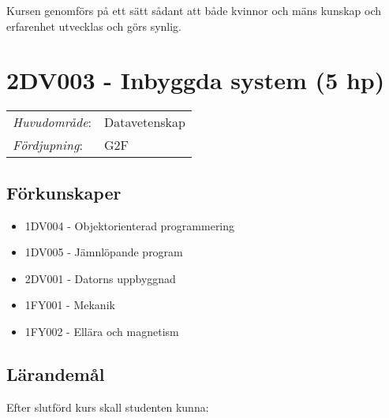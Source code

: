 Kursen genomförs på ett sätt sådant att både kvinnor och mäns kunskap och erfarenhet utvecklas och görs synlig.
\pagebreak
\section*{2DV003 - Inbyggda system (5 hp)}

\begin{tabular}{ll}\emph{Huvudområde}: & Datavetenskap\tabularnewline\emph{Fördjupning}: & G2F\tabularnewline\end{tabular}

\subsection*{Förkunskaper}

\begin{itemize}
\tightlist
\item
  1DV004 - Objektorienterad programmering
\item
  1DV005 - Jämnlöpande program
\item
  2DV001 - Datorns uppbyggnad
\item
  1FY001 - Mekanik
\item
  1FY002 - Ellära och magnetism
\end{itemize}

\subsection*{Lärandemål}

Efter slutförd kurs skall studenten kunna:

